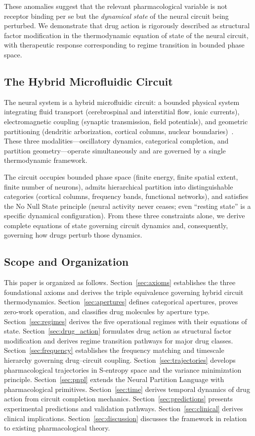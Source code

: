\documentclass[twocolumn,10pt]{article}
\theoremstyle{remark}
\begin{document}
These anomalies suggest that the relevant pharmacological variable is not receptor binding per se but the \emph{dynamical state} of the neural circuit being perturbed. We demonstrate that drug action is rigorously described as structural factor modification in the thermodynamic equation of state of the neural circuit, with therapeutic response corresponding to regime transition in bounded phase space.

\subsection{The Hybrid Microfluidic Circuit}

The neural system is a hybrid microfluidic circuit: a bounded physical system integrating fluid transport (cerebrospinal and interstitial flow, ionic currents), electromagnetic coupling (synaptic transmission, field potentials), and geometric partitioning (dendritic arborization, cortical columns, nuclear boundaries)~\citep{whitesides2006origins,stone2004engineering}. These three modalities---oscillatory dynamics, categorical completion, and partition geometry---operate simultaneously and are governed by a single thermodynamic framework.

The circuit occupies bounded phase space (finite energy, finite spatial extent, finite number of neurons), admits hierarchical partition into distinguishable categories (cortical columns, frequency bands, functional networks), and satisfies the No Null State principle (neural activity never ceases; even ``resting state'' is a specific dynamical configuration). From these three constraints alone, we derive complete equations of state governing circuit dynamics and, consequently, governing how drugs perturb those dynamics.

\subsection{Scope and Organization}

This paper is organized as follows. Section~\ref{sec:axioms} establishes the three foundational axioms and derives the triple equivalence governing hybrid circuit thermodynamics. Section~\ref{sec:apertures} defines categorical apertures, proves zero-work operation, and classifies drug molecules by aperture type. Section~\ref{sec:regimes} derives the five operational regimes with their equations of state. Section~\ref{sec:drug_action} formulates drug action as structural factor modification and derives regime transition pathways for major drug classes. Section~\ref{sec:frequency} establishes the frequency matching and timescale hierarchy governing drug--circuit coupling. Section~\ref{sec:trajectories} develops pharmacological trajectories in S-entropy space and the variance minimization principle. Section~\ref{sec:pnpl} extends the Neural Partition Language with pharmacological primitives. Section~\ref{sec:time} derives temporal dynamics of drug action from circuit completion mechanics. Section~\ref{sec:predictions} presents experimental predictions and validation pathways. Section~\ref{sec:clinical} derives clinical implications. Section~\ref{sec:discussion} discusses the framework in relation to existing pharmacological theory.
\end{document}
